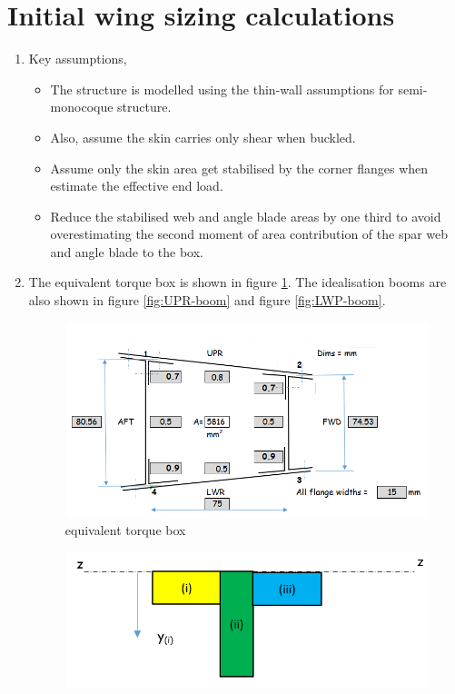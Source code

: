 \documentclass[11pt,a4paper,oneside]{memoir}
\begin{document}
\section{Initial wing sizing calculations}
\begin{enumerate}
    \item Key assumptions,
    \begin{itemize}
        \item The structure is modelled using the thin-wall assumptions for semi-monocoque structure.
        \item Also, assume the skin carries only shear when buckled.
        \item  Assume only the skin area get stabilised by the corner flanges when estimate the effective end load.
        \item Reduce the stabilised web and angle blade areas by one third to avoid overestimating the second moment of area contribution of the spar web and angle blade to the box.
    \end{itemize}
    \item The equivalent torque box is shown in figure \ref{fig:box}. The idealisation booms are also shown in figure \ref{fig:UPR-boom} and figure \ref{fig:LWP-boom}. 
    \begin{figure}[h]
        \centering
        \includegraphics[width = .7\textwidth]{figures/box.png}
        \caption{equivalent torque box}
        \label{fig:box}
    \end{figure}
    \begin{figure}[!hbt]
    \begin{minipage}{.5\textwidth}
    \centering
    \includegraphics[width = \textwidth]{figures/boom-1.png}

\end{minipage}
\end{figure}
\end{enumerate}
\end{document}

